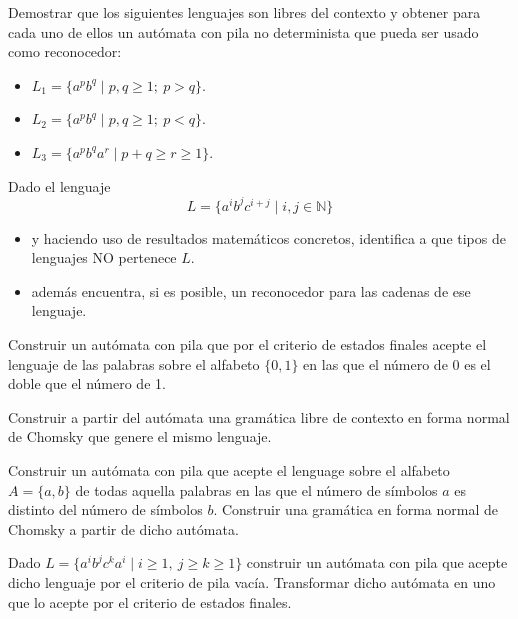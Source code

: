 \begin{ejercicio}\label{ej:1.5.4}
    Demostrar que los siguientes lenguajes son libres del contexto y obtener para cada uno de ellos un autómata con pila no determinista que pueda ser usado como reconocedor:
    \begin{itemize}
        \item $L_1 = \{a^pb^q \mid p,q\geq 1;\ p>q\}$.
        \item $L_2 = \{a^pb^q \mid p,q\geq 1;\ p<q\}$.
        \item $L_3 = \{a^pb^qa^r \mid p+q\geq r\geq 1\}$.
    \end{itemize}
\end{ejercicio}

\begin{ejercicio}\label{ej:1.5.5}
    Dado el lenguaje
    \begin{equation*}
        L = \{a^ib^jc^{i+j}\mid i,j\in \mathbb{N}\}
    \end{equation*}
    \begin{itemize}
        \item y haciendo uso de resultados matemáticos concretos, identifica a que tipos de lenguajes NO pertenece $L$.
        \item además encuentra, si es posible, un reconocedor para las cadenas de ese lenguaje.
    \end{itemize}
\end{ejercicio}

\begin{ejercicio}\label{ej:1.5.6}
    Construir un autómata con pila que por el criterio de estados finales acepte el lenguaje de las palabras sobre el alfabeto $\{0,1\}$ en las que el número de 0 es el doble que el número de 1. 

    Construir a partir del autómata una gramática libre de contexto en forma normal de Chomsky que genere el mismo lenguaje.
\end{ejercicio}

\begin{ejercicio}\label{ej:1.5.7}
    Construir un autómata con pila que acepte el lenguage sobre el alfabeto $A=\{a,b\}$ de todas aquella palabras en las que el número de símbolos $a$ es distinto del número de símbolos $b$. Construir una gramática en forma normal de Chomsky a partir de dicho autómata.
\end{ejercicio}

\begin{ejercicio}\label{ej:1.5.8}
    Dado $L=\{a^i b^j c^k a^i \mid i\geq 1,\ j\geq k \geq 1\}$ construir un autómata con pila que acepte dicho lenguaje por el criterio de pila vacía. Transformar dicho autómata en uno que lo acepte por el criterio de estados finales.
\end{ejercicio}

